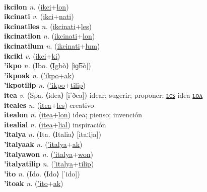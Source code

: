  \label{ikci} \\
\textbf{ikcilon} \textit{n.} (\hyperref[ikci]{ikci}+\hyperref[lon]{lon})
 \label{ikcilon} \\
\textbf{ikcinati} \textit{v.} (\hyperref[ikci]{ikci}+\hyperref[nati]{nati})
 \label{ikcinati} \\
\textbf{ikcinatiles} \textit{n.} (\hyperref[ikcinati]{ikcinati}+\hyperref[les]{les})
 \label{ikcinatiles} \\
\textbf{ikcinatilon} \textit{n.} (\hyperref[ikcinati]{ikcinati}+\hyperref[lon]{lon})
 \label{ikcinatilon} \\
\textbf{ikcinatilum} \textit{n.} (\hyperref[ikcinati]{ikcinati}+\hyperref[lum]{lum})
 \label{ikcinatilum} \\
\textbf{ikciki} \textit{v.} (\hyperref[ikci]{ikci}+\hyperref[ki]{ki})
 \label{ikciki} \\
\textbf{'ikpo} \textit{n.} (Ibo. ⟨Ị̀gbò⟩ [ìɡ͡bò])
 \label{'ikpo} \\
\textbf{'ikpoak} \textit{n.} (\hyperref['ikpo]{'ikpo}+\hyperref[ak]{ak})
 \label{'ikpoak} \\
\textbf{'ikpotilip} \textit{n.} (\hyperref['ikpo]{'ikpo}+\hyperref[tilip]{tilip})
 \label{'ikpotilip} \\
\textbf{itea} \textit{v.} (Spa. ⟨idea⟩ [iˈðea])
idear; sugerir; proponer; \hyperref[iteales]{ʟєꜱ} idea \hyperref[itealon]{ʟᴏᴧ} \label{itea} \\
\textbf{iteales} \textit{n.} (\hyperref[itea]{itea}+\hyperref[les]{les})
creativo \label{iteales} \\
\textbf{itealon} \textit{n.} (\hyperref[itea]{itea}+\hyperref[lon]{lon})
idea; pienso; invención \label{itealon} \\
\textbf{itealial} \textit{n.} (\hyperref[itea]{itea}+\hyperref[lial]{lial})
inspiración \label{itealial} \\
\textbf{'italya} \textit{n.} (Ita. ⟨Italia⟩ [itaːlja])
 \label{'italya} \\
\textbf{'italyaak} \textit{n.} (\hyperref['italya]{'italya}+\hyperref[ak]{ak})
 \label{'italyaak} \\
\textbf{'italyawon} \textit{n.} (\hyperref['italya]{'italya}+\hyperref[won]{won})
 \label{'italyawon} \\
\textbf{'italyatilip} \textit{n.} (\hyperref['italya]{'italya}+\hyperref[tilip]{tilip})
 \label{'italyatilip} \\
\textbf{'ito} \textit{n.} (Ido. ⟨Ido⟩ [ˈido])
 \label{'ito} \\
\textbf{'itoak} \textit{n.} (\hyperref['ito]{'ito}+\hyperref[ak]{ak})
